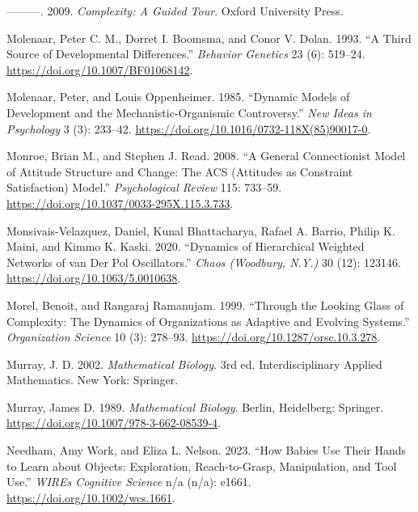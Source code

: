 \documentclass[
  letterpaper,
]{scrbook}
\newlength{\cslhangindent}
\newlength{\cslentryspacingunit} %
\newenvironment{CSLReferences}[2] %
 {%
  \setlength{\parindent}{0pt}
  \ifodd #1
  \let\oldpar\par
  \def\par{\hangindent=\cslhangindent\oldpar}
  \fi
  \setlength{\parskip}{#2\cslentryspacingunit}
 }%
 {}
\begin{document}
\begin{CSLReferences}{1}{0}
\leavevmode{}%
---------. 2009. \emph{Complexity: {A Guided Tour}}. {Oxford University
Press}.

\leavevmode{}%
Molenaar, Peter C. M., Dorret I. Boomsma, and Conor V. Dolan. 1993. {``A
Third Source of Developmental Differences.''} \emph{Behavior Genetics}
23 (6): 519--24. \url{https://doi.org/10.1007/BF01068142}.

\leavevmode{}%
Molenaar, Peter, and Louis Oppenheimer. 1985. {``Dynamic Models of
Development and the Mechanistic-Organismic Controversy.''} \emph{New
Ideas in Psychology} 3 (3): 233--42.
\url{https://doi.org/10.1016/0732-118X(85)90017-0}.

\leavevmode{}%
Monroe, Brian M., and Stephen J. Read. 2008. {``A General Connectionist
Model of Attitude Structure and Change: {The ACS} ({Attitudes} as
{Constraint Satisfaction}) Model.''} \emph{Psychological Review} 115:
733--59. \url{https://doi.org/10.1037/0033-295X.115.3.733}.

\leavevmode{}%
Monsivais-Velazquez, Daniel, Kunal Bhattacharya, Rafael A. Barrio,
Philip K. Maini, and Kimmo K. Kaski. 2020. {``Dynamics of Hierarchical
Weighted Networks of van Der {Pol} Oscillators.''} \emph{Chaos
(Woodbury, N.Y.)} 30 (12): 123146.
\url{https://doi.org/10.1063/5.0010638}.

\leavevmode{}%
Morel, Benoit, and Rangaraj Ramanujam. 1999. {``Through the {Looking
Glass} of {Complexity}: {The Dynamics} of {Organizations} as {Adaptive}
and {Evolving Systems}.''} \emph{Organization Science} 10 (3): 278--93.
\url{https://doi.org/10.1287/orsc.10.3.278}.

\leavevmode{}%
Murray, J. D. 2002. \emph{Mathematical Biology}. 3rd ed.
Interdisciplinary Applied Mathematics. {New York}: {Springer}.

\leavevmode{}%
Murray, James D. 1989. \emph{Mathematical Biology}. Berlin, Heidelberg:
Springer. \url{https://doi.org/10.1007/978-3-662-08539-4}.

\leavevmode{}%
Needham, Amy Work, and Eliza L. Nelson. 2023. {``How Babies Use Their
Hands to Learn about Objects: {Exploration}, Reach-to-Grasp,
Manipulation, and Tool Use.''} \emph{WIREs Cognitive Science} n/a (n/a):
e1661. \url{https://doi.org/10.1002/wcs.1661}.


\end{CSLReferences}
\end{document}

